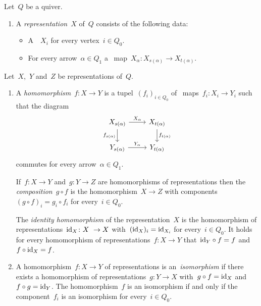 \begin{remarkdefinition}
  Let~$Q$ be a quiver.
  \begin{enumerate}
    \item
      A \emph{representation}~$X$ of~$Q$ consists of the following data:
      \begin{itemize}
        \item
          A~{\kmod}~$X_i$ for every vertex~$i \in Q_0$.
        \item
          For every arrow~$\alpha \in Q_1$ a~{\klin} map~$X_\alpha \colon X_{s(\alpha)} \to X_{t(\alpha)}$.
      \end{itemize}
  \end{enumerate}
  Let~$X$,~$Y$ and~$Z$ be representations of~$Q$.
  \begin{enumerate}[resume]
    \item
      A \emph{homomorphism}~$f \colon X \to Y$ is a tupel~$(f_i)_{i \in Q_0}$ of~{\klin} maps~$f_i \colon X_i \to Y_i$ such that the diagram
      \[
        \begin{tikzcd}
            X_{s(\alpha)}
            \arrow{r}[above]{X_\alpha}
            \arrow{d}[left]{f_{s(\alpha)}}
          & X_{t(\alpha)}
            \arrow{d}[right]{f_{t(\alpha)}}
          \\
            Y_{s(\alpha)}
            \arrow{r}[above]{Y_\alpha}
          & Y_{t(\alpha)}
        \end{tikzcd}
      \]
      commutes for every arrow~$\alpha \in Q_1$.
      
      If~$f \colon X \to Y$ and~$g \colon Y \to Z$ are homomorphisms of representations then the \emph{composition}~$g \circ f$ is the homomorphism~$X \to Z$ with components~$(g \circ f)_i = g_i \circ f_i$ for every~$i \in Q_0$.
      
      The \emph{identity homomorphism} of the representation~$X$ is the homomorphism of representations~$\id_X \colon X \to X$ with~$(\operatorname{id}_X)_i = \operatorname{id}_{X_i}$ for every~$i \in Q_0$.
      It holds for every homomorphism of representations~$f \colon X \to Y$ that~${\operatorname{id}_Y} \circ f = f$ and~$f \circ {\operatorname{id}_X} = f$.
    \item
      A homomorphism~$f \colon X \to Y$ of representations is an~\emph{isomorphism} if there exists a homomorphism of representations~$g \colon Y \to X$ with~$g \circ f = \operatorname{id}_X$ and~$f \circ g = \operatorname{id}_Y$.
      The homomorphism~$f$ is an isomorphism if and only if the component~$f_i$ is an isomorphism for every~$i \in Q_0$.
  \end{enumerate}
\end{remarkdefinition}


